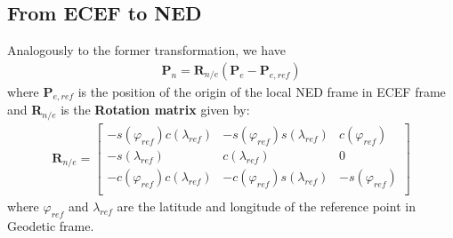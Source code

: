 \subsection*{From ECEF to NED}
Analogously to the former transformation, we have
\begin{align}
\textbf{P}_{n} = \textbf{R}_{n/e}\left(\textbf{P}_{e} - \textbf{P}_{e,ref}\right)
\end{align}
where \textbf{P}$_{e,ref}$ is the position of the origin of the local NED frame in ECEF frame and \textbf{R}$_{n/e}$ is the \textbf{Rotation matrix} given by: 
\begin{align*}
\textbf{R}_{n/e} =
\begin{bmatrix}
-s(\varphi_{ref})c(\lambda_{ref}) & -s(\varphi_{ref})s(\lambda_{ref}) & c(\varphi_{ref})\\
-s(\lambda_{ref}) & c(\lambda_{ref}) & 0\\
-c(\varphi_{ref})c(\lambda_{ref}) & -c(\varphi_{ref})s(\lambda_{ref}) & -s(\varphi_{ref})\\
\end{bmatrix}
\end{align*}
where $\varphi_{ref}$ and $\lambda_{ref}$ are the latitude and longitude of the reference point in Geodetic frame.